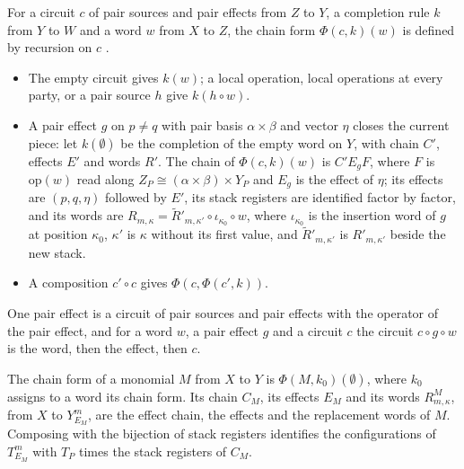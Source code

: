 \begin{definition}
    For a circuit $c$ of pair sources and pair effects from $Z$ to $Y$, a completion
    rule $k$ from $Y$ to $W$ and a word $w$ from $X$ to $Z$, the chain form
    $\Phi(c,k)(w)$ is defined by recursion on $c$
    \cite[Lemma~5.1]{OpenAI2026PolynomialPEPS}.
    \begin{itemize}
        \item The empty circuit gives $k(w)$; a local operation, local operations at
              every party, or a pair source $h$ give $k(h\circ w)$.
        \item A pair effect $g$ on $p\ne q$ with pair basis $\alpha\times\beta$ and
              vector $\eta$ closes the current piece: let $k(\emptyset)$ be the
              completion of the empty word on $Y$, with chain $C'$, effects $E'$ and
              words $R'$. The chain of $\Phi(c,k)(w)$ is $C'E_gF$, where $F$ is
              $\mathrm{op}(w)$ read along $Z_P\cong(\alpha\times\beta)\times Y_P$ and
              $E_g$ is the effect of $\eta$; its effects are $(p,q,\eta)$ followed by
              $E'$, its stack registers are identified factor by factor, and its
              words are $R_{m,\kappa}=\tilde R'_{m,\kappa'}\circ\iota_{\kappa_0}\circ
                  w$, where $\iota_{\kappa_0}$ is the insertion word of $g$ at
              position $\kappa_0$, $\kappa'$ is $\kappa$ without its first value, and
              $\tilde R'_{m,\kappa'}$ is $R'_{m,\kappa'}$ beside the new stack.
        \item A composition $c'\circ c$ gives $\Phi(c,\Phi(c',k))$.
    \end{itemize}
    One pair effect is a circuit of pair sources and pair effects with the operator
    of the pair effect, and for a word $w$, a pair effect $g$ and a circuit $c$ the
    circuit $c\circ g\circ w$ is the word, then the effect, then $c$.

    The chain form of a monomial $M$ from $X$ to $Y$ is $\Phi(M,k_0)(\emptyset)$,
    where $k_0$ assigns to a word its chain form. Its chain $C_M$, its effects $E_M$
    and its words $R^M_{m,\kappa}$, from $X$ to $Y^m_{E_M}$, are the effect chain,
    the effects and the replacement words of $M$. Composing with the bijection of
    stack registers identifies the configurations of $T^m_{E_M}$ with $T_P$ times
    the stack registers of $C_M$.
\end{definition}

